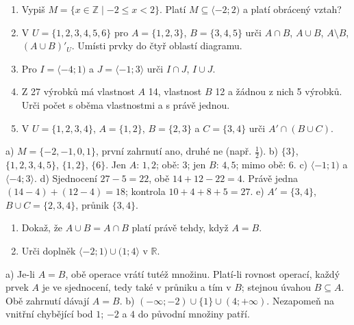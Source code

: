 \documentclass[11pt,a4paper]{article}
\begin{document}
\begin{zadaniReseniBox}[title={S1: samostatný pokus a společná kontrola},breakable=false]
\begin{enumerate}[label=\alph*)]
\item Vypiš $M=\{x\in\mathbb Z\mid-2\le x<2\}$.
Platí $M\subseteq\langle-2;2)$ a platí obrácený vztah?
\item V $U=\{1,2,3,4,5,6\}$ pro $A=\{1,2,3\}$, $B=\{3,4,5\}$
urči $A\cap B$, $A\cup B$, $A\setminus B$, $(A\cup B)'_U$.
Umísti prvky do čtyř oblastí diagramu.
\item Pro $I=\langle-4;1)$ a $J=\langle-1;3\rangle$ urči $I\cap J$, $I\cup J$.
\item Z 27 výrobků má vlastnost $A$ 14, vlastnost $B$ 12 a žádnou z nich 5 výrobků.
Urči počet s oběma vlastnostmi a s právě jednou.
\item V $U=\{1,2,3,4\}$, $A=\{1,2\}$, $B=\{2,3\}$ a $C=\{3,4\}$
urči $A'\cap(B\cup C)$.
\end{enumerate}
\tcblower
a) $M=\{-2,-1,0,1\}$, první zahrnutí ano, druhé ne (např. $\frac12$).
b) $\{3\}$, $\{1,2,3,4,5\}$, $\{1,2\}$, $\{6\}$.
Jen $A$: $1,2$; obě: $3$; jen $B$: $4,5$; mimo obě: $6$.
c) $\langle-1;1)$ a $\langle-4;3\rangle$.
d) Sjednocení $27-5=22$, obě $14+12-22=4$.
Právě jedna $(14-4)+(12-4)=18$; kontrola $10+4+8+5=27$.
e) $A'=\{3,4\}$, $B\cup C=\{2,3,4\}$, průnik $\{3,4\}$.
\end{zadaniReseniBox}

\begin{zadaniReseniBox}[title={R1: od příkladu k obecnému zdůvodnění},breakable=false]
\begin{enumerate}[label=\alph*)]
\item Dokaž, že $A\cup B=A\cap B$ platí právě tehdy, když $A=B$.
\item Urči doplněk $\langle-2;1)\cup(1;4\rangle$ v $\mathbb R$.
\end{enumerate}
\tcblower
a) Je-li $A=B$, obě operace vrátí tutéž množinu.
Platí-li rovnost operací, každý prvek $A$ je ve sjednocení, tedy také
v průniku a tím v $B$; stejnou úvahou $B\subseteq A$.
Obě zahrnutí dávají $A=B$.
b) $(-\infty;-2)\cup\{1\}\cup(4;+\infty)$.
Nezapomeň na vnitřní chybějící bod $1$; $-2$ a $4$ do původní množiny patří.
\end{zadaniReseniBox}
\end{document}
